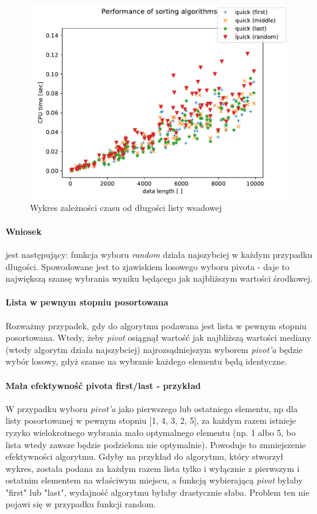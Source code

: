 \documentclass[a4paper,11pt]{report}
\begin{document}
\begin{figure}[h!]
\centering
\includegraphics[scale=0.8]{Figure_1.pdf}
\caption{Wykres zależności czasu od długości listy wsadowej}
\end{figure}

\paragraph{Wniosek}
jest następujący: funkcja wyboru \textit{random} działa najszybciej w każdym przypadku długości. Spowodowane jest to zjawiskiem losowego wyboru pivota - daje to największą szansę wybrania wyniku będącego jak najbliższym wartości środkowej. 


\paragraph{Lista w pewnym stopniu posortowana}
Rozważmy przypadek, gdy do algorytmu podawana jest lista w pewnym stopniu posortowana. Wtedy, żeby \textit{pivot} osiągnął wartość jak najbliższą wartości mediany (wtedy algorytm działa najszybciej) najrozsądniejszym wyborem \textit{pivot'a} będzie wybór losowy, gdyż szanse na wybranie każdego elementu będą identyczne.


\paragraph{Mała efektywność pivota first/last - przykład}
W przypadku wyboru \textit{pivot'a} jako pierwszego lub ostatniego elementu, np dla listy posortowanej w pewnym stopniu [1, 4, 3, 2, 5], za każdym razem istnieje ryzyko wielokrotnego wybrania mało optymalnego elementu (np. 1 albo 5, bo lista wtedy zawsze będzie podzielona nie optymalnie). Powoduje to zmniejszenie efektywności algorytmu. Gdyby na przykład do algorytmu, który stworzył wykres, została podana za każdym razem lista tylko i wyłącznie z pierwszym i ostatnim elementem na właściwym miejscu, a funkcją wybierającą \textit{pivot} byłaby "first" lub "last", wydajność algorytmu byłaby drastycznie słaba. Problem ten nie pojawi się w przypadku funkcji random.
\end{document}
